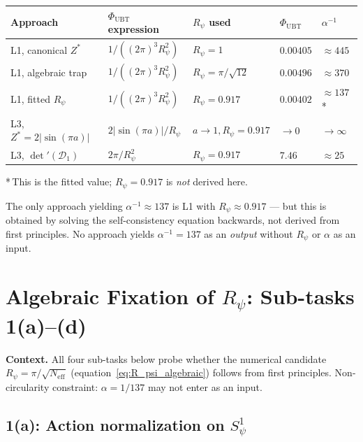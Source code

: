 \documentclass[11pt,a4paper]{article}
\theoremstyle{definition}
\theoremstyle{remark}
\begin{document}
\begin{center}
\begin{tabular}{lllll}
  \toprule
  Approach & $\Phi_{\mathrm{UBT}}$ expression
           & $R_\psi$ used
           & $\Phi_{\mathrm{UBT}}$
           & $\alpha^{-1}$ \\
  \midrule
  L1, canonical $Z^*$
    & $1/((2\pi)^3 R_\psi^2)$
    & $R_\psi=1$
    & $0.00405$
    & $\approx 445$ \\
  L1, algebraic trap
    & $1/((2\pi)^3 R_\psi^2)$
    & $R_\psi=\pi/\sqrt{12}$
    & $0.00496$
    & $\approx 370$ \\
  L1, fitted $R_\psi$
    & $1/((2\pi)^3 R_\psi^2)$
    & $R_\psi=0.917$
    & $0.00402$
    & $\approx 137$\,* \\
  L3, $Z^*=2|\sin(\pi a)|$
    & $2|\sin(\pi a)|/R_\psi$
    & $a\!\to\! 1, R_\psi\!=\!0.917$
    & $\to 0$
    & $\to\infty$ \\
  L3, $\det'(\mathcal{D}_1)$
    & $2\pi/R_\psi^2$
    & $R_\psi=0.917$
    & $7.46$
    & $\approx 25$ \\
  \bottomrule
\end{tabular}
\end{center}
\noindent
*\,This is the fitted value; $R_\psi = 0.917$ is \emph{not} derived here.

\medskip

The only approach yielding $\alpha^{-1} \approx 137$ is L1 with
$R_\psi \approx 0.917$ — but this is obtained by solving the self-consistency
equation backwards, not derived from first principles.
No approach yields $\alpha^{-1} = 137$ as an \emph{output}
without $R_\psi$ or $\alpha$ as an input.

\section{Algebraic Fixation of $R_\psi$: Sub-tasks 1(a)--(d)}
\label{sec:algebraic_Rpsi}

\textbf{Context.}
All four sub-tasks below probe whether the numerical candidate
$R_\psi = \pi/\sqrt{N_{\mathrm{eff}}}$ (equation~\eqref{eq:R_psi_algebraic})
follows from first principles.
Non-circularity constraint: $\alpha = 1/137$ may not enter as an input.

\subsection{1(a): Action normalization on $S^1_\psi$}
\end{document}
